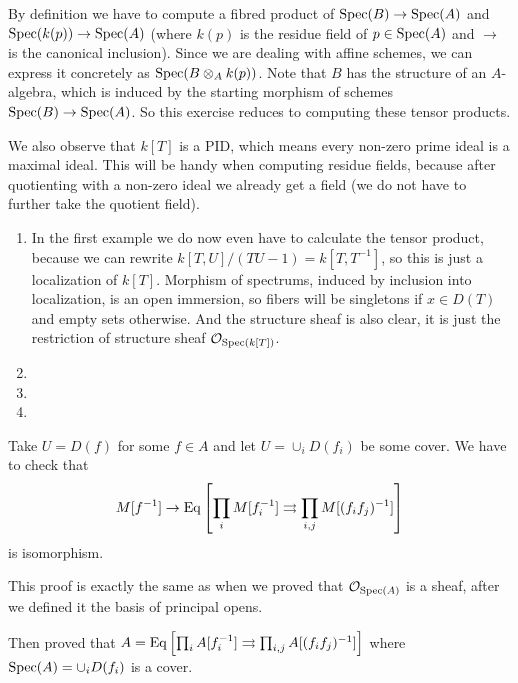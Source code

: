 \begin{exercise}{3}
    By definition we have to compute a fibred product of $\operatorname{Spec}(B) \to \operatorname{Spec}(A)$
    and $\operatorname{Spec}(k(p)) \to \operatorname{Spec}(A)$ (where $k(p)$ is the residue field of $p \in
    \operatorname{Spec}(A)$ and $\to$ is the canonical inclusion). Since we are dealing with
    affine schemes, we can express it concretely as $\operatorname{Spec}(B \otimes_A k(p))$.
    Note that $B$ has the structure of an $A$-algebra, which is induced
    by the starting morphism of schemes $\operatorname{Spec}(B) \rightarrow \operatorname{Spec}(A)$.
    So this exercise reduces to computing these tensor products.
    
    We also observe that $k[T]$ is a PID, which means every non-zero prime ideal
    is a maximal ideal. This will be handy when computing residue fields,
    because after quotienting with a non-zero ideal we already get a field (we do
    not have to further take the quotient field).

    \begin{enumerate}
        \item{In the first example we do now even have to calculate the tensor
            product, because we can rewrite $k[T, U]/(TU - 1) = k[T, T^{-1}]$,
            so this is just a localization of $k[T]$. Morphism of spectrums,
            induced by inclusion into localization, is an open immersion, so
            fibers will be singletons if $x \in D(T)$ and empty sets otherwise.
            And the structure sheaf is also clear, it is just the restriction of
            structure sheaf $\mathcal{O}_{\operatorname{Spec}(k[T])}$.}
        \item{}
        \item{}
        \item{}
    \end{enumerate}
\end{exercise}

\begin{exercise}{4}
    Take $U = D(f)$ for some $f \in A$ and let $U = \cup_i D(f_i)$ be some
    cover. We have to check that 
    \begin{equation*}
        M[f^{-1}] \rightarrow \operatorname{Eq}\left[ \prod_i M[f^{-1}_i] \rightrightarrows
        \prod_{i, j} M[(f_i f_j)^{-1}]  \right]
    \end{equation*}
    is isomorphism.

    This proof is exactly the same as when we proved that
    $\mathcal{O}_{\operatorname{Spec}(A)}$ is a sheaf, after we defined it the basis of
    principal opens.

    Then proved that $A = \operatorname{Eq}\left[ \prod_i A[f^{-1}_i] \rightrightarrows
    \prod_{i, j} A[(f_i f_j)^{-1}]  \right]$ where $\operatorname{Spec}(A) = \cup_i
    D(f_i)$ is a cover.

    \end{exercise}


